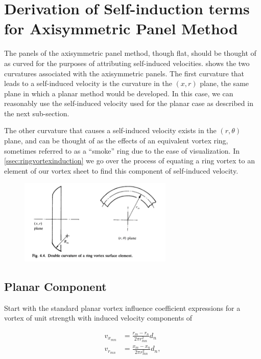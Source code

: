 \section{Derivation of Self-induction terms for Axisymmetric Panel Method}
\label{sec:axisym_selfinduction}

The panels of the axisymmetric panel method, though flat, should be thought of as curved for the purposes of attributing self-induced velocities.
 shows the two curvatures associated with the axisymmetric panels.
The first curvature that leads to a self-induced velocity is the curvature in the \((x,r)\) plane, the same plane in which a planar method would be developed.
In this case, we can reasonably use the self-induced velocity used for the planar case as described in the next sub-section.

The other curvature that causes a self-induced velocity exists in the \((r,\theta)\) plane, and can be thought of as the effects of an equivalent vortex ring, sometimes referred to as a ``smoke'' ring due to the ease of visualization.
In \cref{ssec:ringvortexinduction} we go over the process of equating a ring vortex to an element of our vortex sheet to find this component of self-induced velocity.

\begin{figure}[h!]
    \centering
    \includegraphics[width=0.65\textwidth]{./figures/axisym_selfinduced_geometry}
    \caption{}
    \label{fig:axisym_selfinduced_geometry}
\end{figure}


\subsection{Planar Component}
\label{app:planarselfinducedvelocity}

Start with the standard planar vortex influence coefficient expressions for a vortex of unit strength with induced velocity components of

\begin{align}
    v_{x_{mn}} &= \frac{r_m - r_n}{2 \pi r^2_{mn}} d_n \\
    v_{r_{mn}} &= \frac{x_m - x_n}{2 \pi r^2_{mn}} d_n,
\end{align}

